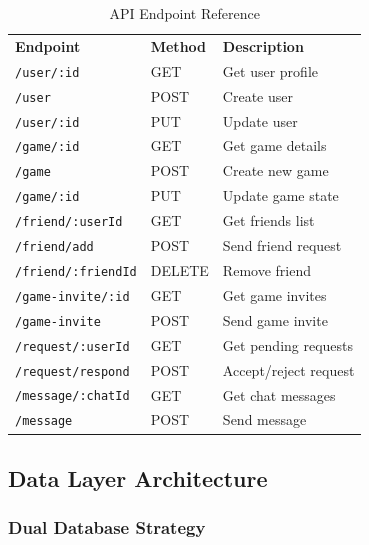 \begin{table}[ht]
\centering
{}
\begin{tabular}{|s|t|u|}
\hline
{}  \\ \hline
\textbf{Endpoint} & \textbf{Method} & \textbf{Description} \\ \hline
\texttt{/user/:id} & GET & Get user profile \\ \hline
\texttt{/user} & POST & Create user \\ \hline
\texttt{/user/:id} & PUT & Update user \\ \hline
\texttt{/game/:id} & GET & Get game details \\ \hline
\texttt{/game} & POST & Create new game \\ \hline
\texttt{/game/:id} & PUT & Update game state \\ \hline
\texttt{/friend/:userId} & GET & Get friends list \\ \hline
\texttt{/friend/add} & POST & Send friend request \\ \hline
\texttt{/friend/:friendId} & DELETE & Remove friend \\ \hline
\texttt{/game-invite/:id} & GET & Get game invites \\ \hline
\texttt{/game-invite} & POST & Send game invite \\ \hline
\texttt{/request/:userId} & GET & Get pending requests \\ \hline
\texttt{/request/respond} & POST & Accept/reject request \\ \hline
\texttt{/message/:chatId} & GET & Get chat messages \\ \hline
\texttt{/message} & POST & Send message \\ \hline
\end{tabular}
\caption{API Endpoint Reference}
\label{table:api-endpoints}
\end{table}

\subsection*{Data Layer Architecture}

\subsubsection*{Dual Database Strategy}

